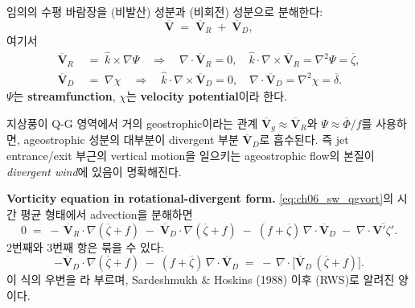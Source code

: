 \begin{definition}\label{def:ch06_sw_helmholtz}
임의의 수평 바람장을 (비발산) 성분과 (비회전) 성분으로 분해한다:
\begin{equation}\label{eq:ch06_sw_helmholtz}
  \overline{\mathbf{V}} \;=\; \overline{\mathbf{V}}_R \;+\; \overline{\mathbf{V}}_D ,
\end{equation}
여기서
\begin{align}
  \overline{\mathbf{V}}_R &\;=\; \hat{k}\!\times\!\nabla\Psi
      \quad\Longrightarrow\quad \nabla\!\cdot\!\overline{\mathbf{V}}_R = 0,\quad
      \hat{k}\!\cdot\!\nabla\!\times\!\overline{\mathbf{V}}_R = \nabla^2 \Psi = \overline{\zeta},
      \label{eq:ch06_sw_rotwind}\\[2pt]
  \overline{\mathbf{V}}_D &\;=\; \nabla \chi
      \quad\Longrightarrow\quad \hat{k}\!\cdot\!\nabla\!\times\!\overline{\mathbf{V}}_D = 0,\quad
      \nabla\!\cdot\!\overline{\mathbf{V}}_D = \nabla^2 \chi = \overline{\delta} .
      \label{eq:ch06_sw_divwind}
\end{align}
$\Psi$는 \textbf{streamfunction}, $\chi$는 \textbf{velocity potential}이라 한다.
\end{definition}

지상풍이 Q-G 영역에서 거의 geostrophic이라는 관계 $\overline{\mathbf{V}}_g \approx \overline{\mathbf{V}}_R$와
$\Psi \approx \overline{\Phi}/f$를 사용하면,
ageostrophic 성분의 대부분이 divergent 부분 $\overline{\mathbf{V}}_D$로 흡수된다.
즉 jet entrance/exit 부근의 vertical motion을 일으키는 ageostrophic flow의 본질이
\emph{divergent wind}에 있음이 명확해진다.

\medskip



\noindent\textbf{Vorticity equation in rotational-divergent form.}
\eqref{eq:ch06_sw_qgvort}의 시간 평균 형태에서 advection을 분해하면
\begin{equation}\label{eq:ch06_sw_vorRD}
  0 \;=\; -\,\overline{\mathbf{V}}_R\!\cdot\!\nabla(\overline{\zeta}+f)
       \;-\; \overline{\mathbf{V}}_D\!\cdot\!\nabla(\overline{\zeta}+f)
       \;-\; (f+\overline{\zeta})\,\nabla\!\cdot\!\overline{\mathbf{V}}_D
       \;-\; \nabla\!\cdot\!\overline{\mathbf{V}'\zeta'} .
\end{equation}
2번째와 3번째 항은 묶을 수 있다:
\begin{equation}\label{eq:ch06_sw_vorflux}
  -\overline{\mathbf{V}}_D\!\cdot\!\nabla(\overline{\zeta}+f)
  \;-\; (f+\overline{\zeta})\,\nabla\!\cdot\!\overline{\mathbf{V}}_D
  \;=\; -\,\nabla\!\cdot\!\bigl[\overline{\mathbf{V}}_D\,(\overline{\zeta}+f)\bigr] .
\end{equation}
이 식의 우변을 라 부르며,
Sardeshmukh \& Hoskins (1988) 이후  (RWS)로 알려진 양이다.

